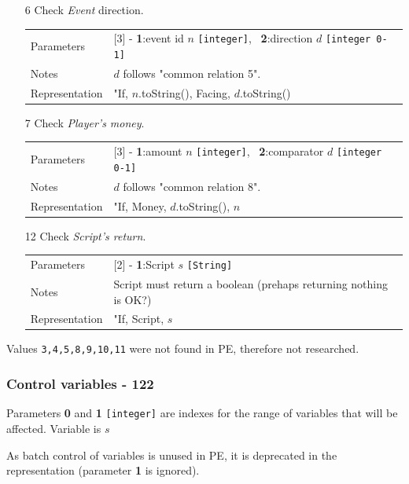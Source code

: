 \documentclass[11pt]{article}
\begin{document}
\begin{itemize}
	\item[6] Check \textit{Event} direction.
	
	\begin{tabular}{|a l|}
		\hline
		Parameters & [3] - \textbf{1}:event id $n$ \verb|[integer]|, \ \textbf{2}:direction $d$ \verb|[integer 0-1]| \\
		Notes & $d$ follows "common relation 5". \\
		Representation & "If, $n$.toString(), Facing, $d$.toString() \\
		\hline
	\end{tabular}
	
	\item[7] Check \textit{Player's money}.
	
	\begin{tabular}{|a l|}
		\hline
		Parameters & [3] - \textbf{1}:amount $n$ \verb|[integer]|, \ \textbf{2}:comparator $d$ \verb|[integer 0-1]| \\
		Notes & $d$ follows "common relation 8". \\
		Representation & "If, Money, $d$.toString(), $n$ \\
		\hline
	\end{tabular}
	
	\item[12] Check \textit{Script's return}.
	
	\begin{tabular}{|a l|}
		\hline
		Parameters & [2] - \textbf{1}:Script $s$ \verb|[String]| \\
		Notes & Script must return a boolean (prehaps returning nothing is OK?) \\
		Representation & "If, Script, $s$ \\
		\hline
	\end{tabular}
	
\end{itemize}

Values \verb|3,4,5,8,9,10,11| were not found in PE, therefore not researched.


\subsubsection{Control variables - 122}
\label{sec:varctrl}

Parameters \textbf{0} and \textbf{1} \verb|[integer]| are indexes for the range of variables that will be affected. Variable is $s$

As batch control of variables is unused in PE, it is deprecated in the representation (parameter \textbf{1} is ignored).
\end{document}
